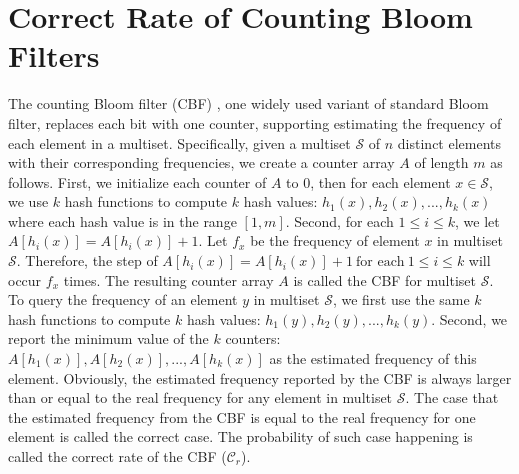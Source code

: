 \presec
\newpage
\section{Correct Rate of Counting Bloom Filters}\postsec
\label{sec:cbfcr}
The counting Bloom filter (CBF) \cite{cbf}, one widely used variant of standard Bloom filter, replaces each bit with one counter, supporting estimating the frequency of each element in a multiset. 
Specifically, given a multiset $\mathcal{S}$ of $n$ distinct elements with their corresponding frequencies, we create a counter array $A$ of length $m$ as follows. 
First, we initialize each counter of $A$ to 0, then for each element $x \in \mathcal{S}$, we use $k$ hash functions to compute $k$ hash values: $h_1(x), h_2(x),..., h_{k}(x)$ where each hash value is in the range $[1, m]$.
%
Second, for each $1 \leqslant i \leqslant k$, we let $A[h_i(x)]=A[h_i(x)] +1$.
%
Let $f_x$ be the frequency of element $x$ in multiset $\mathcal{S}$. 
Therefore, the step of $A[h_i(x)]=A[h_i(x)] +1~\text{for each}~1 \leqslant i \leqslant k$ will occur $f_x$ times. 
%
The resulting counter array $A$ is called the CBF for multiset $\mathcal{S}$.
%
To query the frequency of an element $y$ in multiset $\mathcal{S}$, we first use the same $k$ hash functions to compute $k$ hash values: $h_1(y), h_2(y),..., h_{k}(y)$.
%
Second, we report the minimum value of the $k$ counters: $A[h_1(x)], A[h_2(x)], ..., A[h_k(x)]$ as the estimated frequency of this element. 
%
Obviously, the estimated frequency reported by the CBF is always  larger than or equal to the real frequency for any element in multiset $\mathcal{S}$. 
The case that the estimated frequency from the CBF is equal to the real frequency for one element is called the correct case. 
The probability of such case happening is called the correct rate of the CBF ($\mathcal{C}_r$). 


